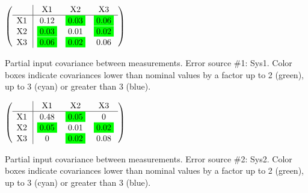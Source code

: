 \begin{table}[H]
\scriptsize
\begin{center}
\renewcommand{\arraystretch}{1.1}
\begin{math}\left(\begin{array}{c|ccc}
 & \mathrm{X1} & 
\mathrm{X2} & 
\mathrm{X3} \\
\hline
\mathrm{X1} \hspace*{2pt} &       0.12 &  \colorbox{Green1}{$      0.03$} &  \colorbox{Green1}{$      0.06$} \\
\mathrm{X2} \hspace*{2pt} &  \colorbox{Green1}{$      0.03$} &       0.01 &  \colorbox{Green1}{$      0.02$} \\
\mathrm{X3} \hspace*{2pt} &  \colorbox{Green1}{$      0.06$} &  \colorbox{Green1}{$      0.02$} &       0.06 \\
\end{array}\right)\end{math}
\caption{Partial input covariance between measurements. Error source \#1: Sys1. Color boxes indicate covariances lower than nominal values by a factor up to 2 (green), up to 3 (cyan) or greater than 3 (blue).}
\renewcommand{\arraystretch}{1}
\end{center}
\end{table}
\begin{table}[H]
\scriptsize
\begin{center}
\renewcommand{\arraystretch}{1.1}
\begin{math}\left(\begin{array}{c|ccc}
 & \mathrm{X1} & 
\mathrm{X2} & 
\mathrm{X3} \\
\hline
\mathrm{X1} \hspace*{2pt} &       0.48 &  \colorbox{Green1}{$      0.05$} &  0 \\
\mathrm{X2} \hspace*{2pt} &  \colorbox{Green1}{$      0.05$} &       0.01 &  \colorbox{Green1}{$      0.02$} \\
\mathrm{X3} \hspace*{2pt} &  0 &  \colorbox{Green1}{$      0.02$} &       0.08 \\
\end{array}\right)\end{math}
\caption{Partial input covariance between measurements. Error source \#2: Sys2. Color boxes indicate covariances lower than nominal values by a factor up to 2 (green), up to 3 (cyan) or greater than 3 (blue).}
\renewcommand{\arraystretch}{1}
\end{center}
\end{table}
